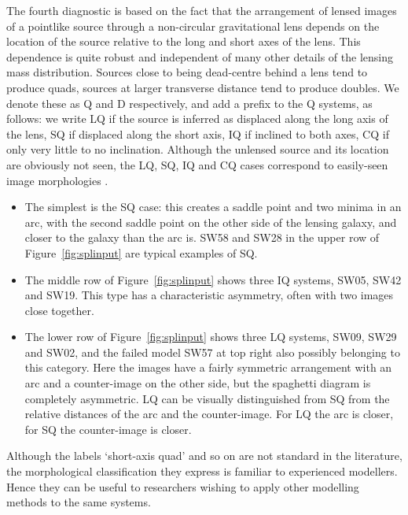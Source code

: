 The fourth diagnostic is based on the fact that the arrangement of
lensed images of a pointlike source through a non-circular
gravitational lens depends on the location of the source relative to
the long and short axes of the lens.  This dependence is quite robust
and independent of many other details of the lensing mass
distribution.  Sources close to being dead-centre behind a lens tend
to produce quads, sources at larger transverse distance tend to
produce doubles.  We denote these as Q and D respectively, and add a
prefix to the Q systems, as follows: we write LQ if the source is
inferred as displaced along the long axis of the lens, SQ if displaced
along the short axis, IQ if inclined to both axes, CQ if only very little to
no inclination.  Although the
unlensed source and its location are obviously not seen, the LQ, SQ, IQ and CQ
cases correspond to easily-seen image morphologies \citep[see,
  e.g.,][]{2003AJ....125.2769S}.
\begin{itemize}
\item The simplest is the SQ case: this creates a saddle point and two
  minima in an arc, with the second saddle point on the other side of
  the lensing galaxy, and closer to the galaxy than the arc is.  SW58
  and SW28 in the upper row of Figure~\ref{fig:splinput} are typical
  examples of SQ.
\item The middle row of Figure~\ref{fig:splinput} shows three IQ
  systems, SW05, SW42 and SW19.  This type has a characteristic
  asymmetry, often with two images close together.
\item The lower row of Figure~\ref{fig:splinput} shows three LQ
  systems, SW09, SW29 and SW02, and the failed model SW57 at top right
  also possibly belonging to this category.  Here the images have a
  fairly symmetric arrangement with an arc and a counter-image on the
  other side, but the spaghetti diagram is completely asymmetric.  LQ
  can be visually distinguished from SQ from the relative distances of
  the arc and the counter-image.  For LQ the arc is closer, for SQ the
  counter-image is closer.
\end{itemize}
Although the labels `short-axis quad' and so on are not standard in
the literature, the morphological classification they express is
familiar to experienced modellers.  Hence they can be useful to
researchers wishing to apply other modelling methods to the same
systems.

